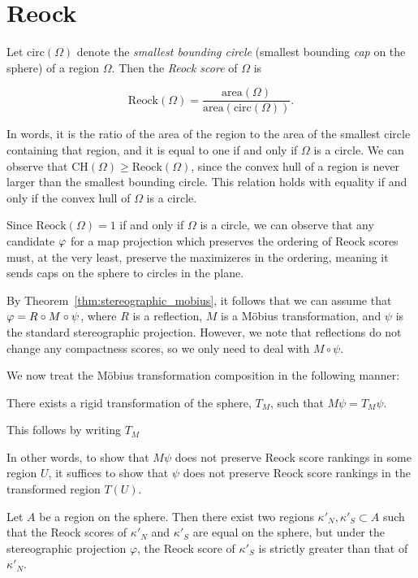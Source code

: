 \section{Reock}\label{sec:reock}

Let $\mathrm{circ}(\Omega)$ denote the \textit{smallest bounding
circle} (smallest bounding \textit{cap} on the sphere) of a region
$\Omega$.  Then the \textit{Reock score} of $\Omega$ is 

$$\mathrm{Reock}(\Omega)=
\frac{\mathrm{area}(\Omega)}{\mathrm{area}(\mathrm{circ}(\Omega))}.$$

In words, it is the ratio of the area of the region to the area of the
smallest circle containing that region, and it is equal to one if and
only if $\Omega$ is a circle.  We can observe that
$\mathrm{CH}(\Omega)\geq \mathrm{Reock}(\Omega)$, since the convex
hull of a region is never larger than the smallest bounding circle.
This relation holds with equality if and only if the convex hull of
$\Omega$ is a circle.  

Since $\mathrm{Reock}(\Omega)=1$ if and only if $\Omega$ is a circle,
we can observe that any candidate $\varphi$ for a map projection 
which preserves the ordering of Reock scores must, at the 
very least, preserve the maximizeres in the ordering, meaning 
it sends caps on the sphere to circles in the plane.  

By Theorem~\ref{thm:stereographic_mobius}, it follows that 
we can assume that $\varphi=R\circ M \circ \psi$, 
where $R$ is a reflection, $M$ is a M\"{o}bius 
transformation, and $\psi$ is the standard 
stereographic projection. However, we note that reflections do not 
change any compactness scores, so we only need 
to deal with $M\circ \psi$.

We now treat the M\"{o}bius transformation composition 
in the following manner:
\begin{claim}
  There exists a rigid transformation of the 
  sphere, $T_M$, such that $M\psi = T_M\psi$.
\end{claim}
This follows by writing $T_M$

In other words, to show that $M\psi$ 
does not preserve Reock score rankings 
in some region $U$, it suffices to show that 
$\psi$ does not preserve Reock score 
rankings in the transformed region 
$T(U)$.

\begin{theorem}\label{thm:reock}
  Let $A$ be a region on the sphere.  Then there exist two regions
  $\kappa'_N,\kappa'_S\subset A$ such that the Reock scores of
  $\kappa'_N$ and $\kappa'_S$ are equal on the sphere, but under the
  stereographic projection $\varphi$, the Reock score of $\kappa'_S$
  is strictly greater than that of $\kappa'_N$. 
\end{theorem}


